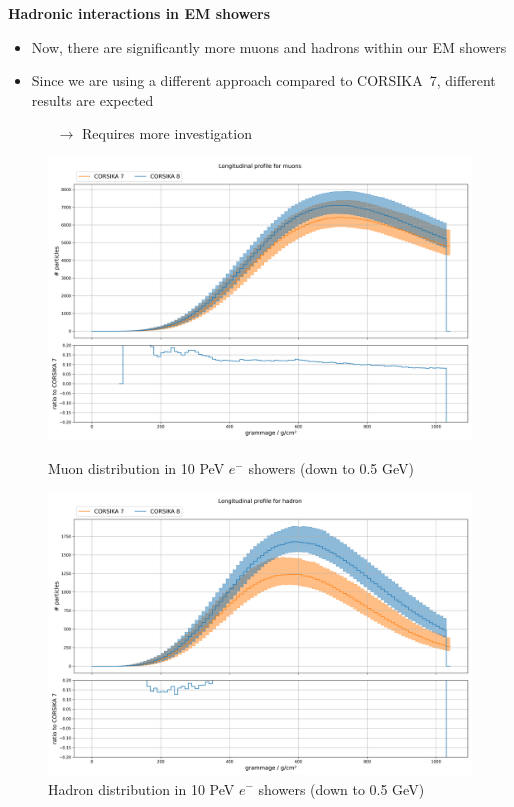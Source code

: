 \documentclass[aspectratio=1610, 9pt]{beamer}
\begin{document}
\begin{frame}
\textbf{Hadronic interactions in EM showers}

  \begin{itemize}
    \item Now, there are significantly more muons and hadrons within our EM showers
    \item Since we are using a different approach compared to CORSIKA~7, different results are expected
    \begin{itemize}
      \item[$\rightarrow$] Requires more investigation
    \end{itemize}
  \end{itemize}

  \begin{figure}[!htb]
      \includegraphics[width=0.9\linewidth]{plots/long_muons.png}
      \caption*{Muon distribution in 10 PeV $e^-$ showers (down to 0.5 GeV)}
    \endminipage%
      \includegraphics[width=0.9\linewidth]{plots/long_hadron.png}
      \caption*{Hadron distribution in 10 PeV $e^-$ showers (down to 0.5 GeV)}
    \endminipage
  \end{figure}
  \vspace{-0.3cm}
\end{frame}
\end{document}
